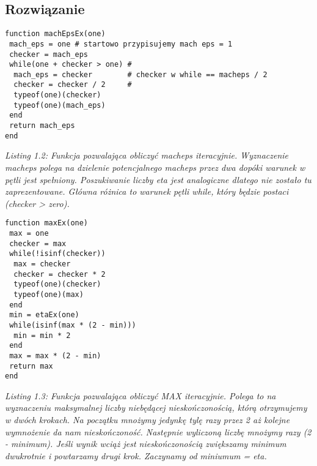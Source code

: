 \documentclass[]{article}
\begin{document}
\subsection{Rozwiązanie}
\begin{lstlisting}
function machEpsEx(one)
 mach_eps = one	# startowo przypisujemy mach eps = 1
 checker = mach_eps 
 while(one + checker > one) #
  mach_eps = checker	    # checker w while == macheps / 2
  checker = checker / 2     #
  typeof(one)(checker)
  typeof(one)(mach_eps)
 end
 return mach_eps
end
\end{lstlisting}
\textit{Listing 1.2: Funkcja pozwalająca obliczyć macheps iteracyjnie. Wyznaczenie macheps polega na dzielenie potencjalnego macheps przez dwa dopóki warunek w pętli jest spełniony.  Poszukiwanie liczby eta jest analogiczne dlatego nie zostało tu zaprezentowane. Główna różnica to warunek pętli while, który będzie postaci (checker > zero).}
\\
\begin{lstlisting}
function maxEx(one)
 max = one
 checker = max
 while(!isinf(checker))
  max = checker
  checker = checker * 2
  typeof(one)(checker)
  typeof(one)(max)
 end
 min = etaEx(one)
 while(isinf(max * (2 - min)))
  min = min * 2    
 end
 max = max * (2 - min)
 return max
end
\end{lstlisting}
\textit{Listing 1.3: Funkcja pozwalająca obliczyć MAX iteracyjnie. Polega to na wyznaczeniu maksymalnej liczby niebędącej nieskończonością, którą otrzymujemy w dwóch krokach. Na początku mnożymy jedynkę tylę razy przez 2 aż kolejne wymnożenie da nam nieskończoność. Następnie wyliczoną liczbę mnożymy razy (2 - minimum). Jeśli wynik wciąż jest nieskończonością zwiększamy minimum dwukrotnie i powtarzamy drugi krok. Zaczynamy od miniumum = eta.}
\newpage
\end{document}
